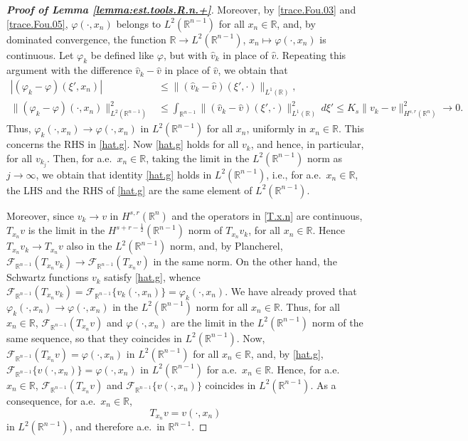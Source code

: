 \documentclass[10pt,reqno,a4paper]{article}
\numberwithin{equation}{section}
\theoremstyle{plain}
\theoremstyle{definition}
\newcommand{\R}{{\mathbb R}}
\newcommand{\mF}{\mathcal{F}}
\newcommand{\ph}{\varphi}
\begin{document}
\begin{proof}[\textbf{Proof of Lemma \ref{lemma:est.tools.R.n.+}}]
Moreover, by \eqref{trace.Fou.03} and \eqref{trace.Fou.05}, 
$\ph(\cdot, x_n)$ belongs to $L^2(\R^{n-1})$ for all $x_n \in \R$, 
and, by dominated convergence, the function $\R \to L^2(\R^{n-1})$, 
$x_n \mapsto \ph(\cdot, x_n)$ is continuous. 
Let $\ph_k$ be defined like $\ph$, but with $\hat v_k$ in place of $\hat v$. 
Repeating this argument with the difference $\hat v_k - \hat v$ in place of $\hat v$, 
we obtain that  
\begin{align} 
\label{trace.Fou.06}
|(\ph_k - \ph)(\xi', x_n)| 
& \leq \|(\hat v_k - \hat v)(\xi', \cdot) \|_{L^1(\R)}, 
\\
\| (\ph_k - \ph)(\cdot, x_n) \|_{L^2(\R^{n-1})}^2
& \leq \int_{\R^{n-1}} \| (\hat v_k - \hat v)(\xi', \cdot) \|_{L^1(\R)}^2 \, d\xi' 
\leq K_s \| v_k - v \|_{H^{s,r}(\R^n)}^2 
\to 0.
\label{trace.Fou.07}
\end{align}
Thus, $\ph_k(\cdot, x_n) \to \ph(\cdot, x_n)$ in $L^2(\R^{n-1})$ for all $x_n$, uniformly in $x_n \in \R$. 
This concerns the RHS in \eqref{hat.g}. 
Now \eqref{hat.g} holds for all $v_k$, and hence, in particular, for all $v_{k_j}$. 
Then, for a.e.\ $x_n \in \R$, 
taking the limit in the $L^2(\R^{n-1})$ norm as $j \to \infty$, 
we obtain that identity \eqref{hat.g} holds in $L^2(\R^{n-1})$, 
i.e., for a.e.\ $x_n \in \R$, 
the LHS and the RHS of \eqref{hat.g} are the same element of $L^2(\R^{n-1})$. 

Moreover, since $v_{k} \to v$ in $H^{s,r}(\R^n)$ 
and the operators in \eqref{T.x.n} are continuous, 
$T_{x_n} v$ is the limit in the $H^{s+r-\frac12}(\R^{n-1})$ norm of $T_{x_n} v_{k}$, 
for all $x_n \in \R$.  
Hence $T_{x_n} v_{k} \to T_{x_n} v$ also in the $L^2(\R^{n-1})$ norm, 
and, by Plancherel, $\mF_{\R^{n-1}}(T_{x_n} v_{k}) \to \mF_{\R^{n-1}}(T_{x_n} v)$ in the same norm. 
On the other hand, the Schwartz functions $v_{k}$ satisfy \eqref{hat.g}, 
whence 
$\mF_{\R^{n-1}}(T_{x_n} v_{k}) 
= \mF_{\R^{n-1}} \{ v_{k}(\cdot, x_n) \} 
= \ph_{k}(\cdot,x_n)$. 
We have already proved that $\ph_k(\cdot, x_n) \to \ph(\cdot, x_n)$ in the $L^2(\R^{n-1})$ norm 
for all $x_n \in \R$. 
Thus, for all $x_n \in \R$, 
$\mF_{\R^{n-1}}(T_{x_n} v)$ and $\ph(\cdot,x_n)$ are the limit in the $L^2(\R^{n-1})$ norm 
of the same sequence, so that they coincides in $L^2(\R^{n-1})$. 
Now, $\mF_{\R^{n-1}}(T_{x_n} v) = \ph(\cdot,x_n)$ in $L^2(\R^{n-1})$ for all $x_n \in \R$,
and, by \eqref{hat.g},  
$\mF_{\R^{n-1}} \{ v(\cdot, x_n) \} = \ph(\cdot,x_n)$ in $L^2(\R^{n-1})$ for a.e.\ $x_n \in \R$. 
Hence, for a.e.\ $x_n \in \R$, 
$\mF_{\R^{n-1}}(T_{x_n} v)$ and $\mF_{\R^{n-1}} \{ v(\cdot, x_n) \}$ coincides in $L^2(\R^{n-1})$. 
As a consequence, for a.e.\ $x_n \in \R$,  
\begin{equation} \label{surprise}
T_{x_n} v = v(\cdot , x_n) 
\end{equation}
in $L^2(\R^{n-1})$, and therefore a.e.\ in $\R^{n-1}$. 
  

\end{proof}
\end{document}
